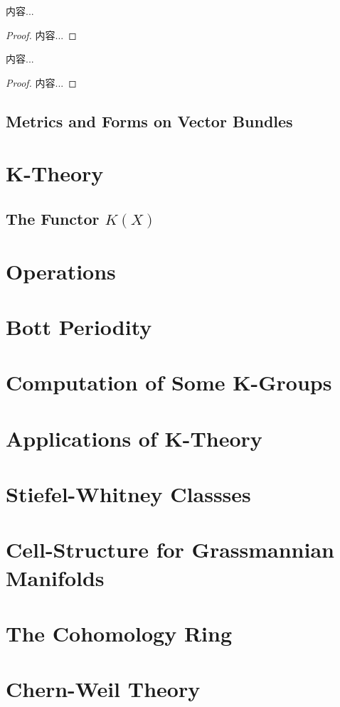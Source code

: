 \documentclass[Total.tex]{subfiles}
\begin{document}
			\begin{theorem}
				内容...
			\end{theorem}
			\begin{proof}
				内容...
			\end{proof}
			
			\begin{theorem}
				内容...
			\end{theorem}
			\begin{proof}
				内容...
			\end{proof}
			
		\section{Metrics and Forms on Vector Bundles}
	\chapter{K-Theory}
		\section{The Functor $K(X)$}
	\chapter{Operations}
	\chapter{Bott Periodity}
	\chapter{Computation of Some K-Groups}
	\chapter{Applications of K-Theory}
	
	\chapter{Stiefel-Whitney Classses}
	\chapter{Cell-Structure for Grassmannian Manifolds}
	\chapter{The Cohomology Ring}
	\chapter{Chern-Weil Theory}
			
\end{document}
